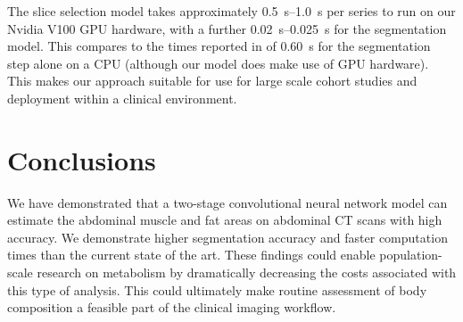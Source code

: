 \documentclass{llncs}
\begin{document}
The slice selection model takes approximately \SIrange{0.5}{1.0}{\second} per series to run on our Nvidia V100 GPU hardware, with a further \SIrange{0.02}{0.025}{\second} for the segmentation model.
This compares to the times reported in \cite{Popuri2016} of \SI{0.60}{\second} for the segmentation step alone on a CPU (although our model does make use of GPU hardware).
This makes our approach suitable for use for large scale cohort studies and deployment within a clinical environment.

\section{Conclusions}
We have demonstrated that a two-stage convolutional neural network model can estimate the abdominal muscle and fat areas on abdominal CT scans with high accuracy.
We demonstrate higher segmentation accuracy and faster computation times than the current state of the art.
These findings could enable population-scale research on metabolism by dramatically decreasing the costs associated with this type of analysis.
This could ultimately make routine assessment of body composition a feasible part of the clinical imaging workflow. 




\end{document}
